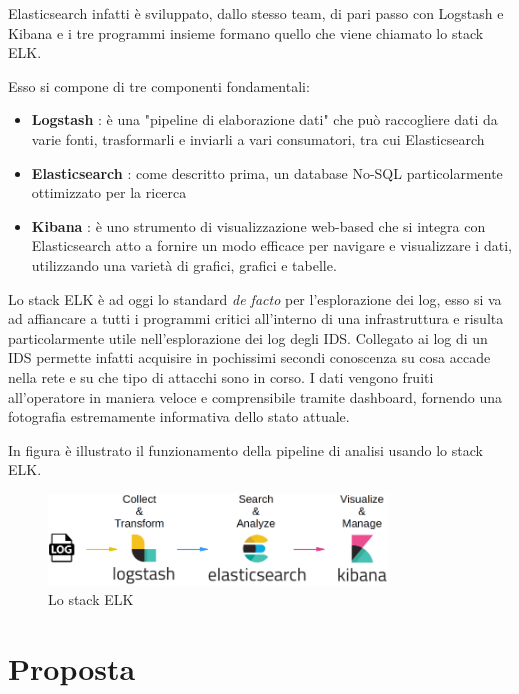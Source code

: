 \documentclass[12pt,a4paper,openright,twoside]{report}
\begin{document}
Elasticsearch infatti \`e sviluppato, dallo stesso team, di pari passo con Logstash
e Kibana e i tre programmi insieme formano quello che viene chiamato lo stack ELK.

Esso si compone di tre componenti fondamentali:
\begin{itemize}
  \item {\bf Logstash} : \`e una "pipeline di elaborazione dati" che pu\`o raccogliere
  dati da varie fonti, trasformarli e inviarli a vari consumatori, tra cui Elasticsearch
  \item {\bf Elasticsearch} : come descritto prima, un database No-SQL particolarmente ottimizzato per la
  ricerca
  \item {\bf Kibana} : \`e uno strumento di visualizzazione web-based che si integra
  con Elasticsearch atto a fornire un modo efficace per navigare e visualizzare i dati,
  utilizzando una variet\`a di grafici, grafici e tabelle.
\end{itemize}


Lo stack ELK \`e ad oggi lo standard {\it de facto} per l'esplorazione dei log,
esso si va ad affiancare a tutti i programmi critici all'interno di una infrastruttura
e risulta particolarmente utile nell'esplorazione dei log degli IDS. Collegato ai log di
un IDS permette infatti
acquisire in pochissimi secondi conoscenza su cosa accade nella rete e su che tipo di attacchi
sono in corso. I dati vengono fruiti all'operatore in maniera veloce e comprensibile tramite
dashboard, fornendo una fotografia estremamente informativa dello stato attuale.

In figura \`e illustrato il funzionamento della pipeline di analisi usando lo stack
ELK.

\begin{figure}
  \begin{center}                          %
    \includegraphics[width=90mm]{images/ELK-stack.png}
    \caption{Lo stack ELK}
    \label{}
  \end{center}
\end{figure}


\newpage

\chapter{Proposta}                %
\lhead[\fancyplain{}{\bfseries\thepage}]{\fancyplain{}{\bfseries\rightmark}}
\end{document}
